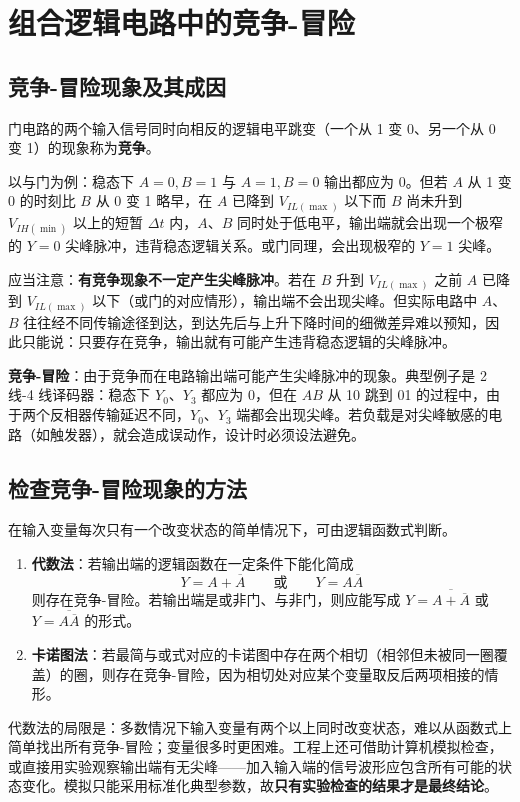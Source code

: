 \section{组合逻辑电路中的竞争-冒险}
\subsection{竞争-冒险现象及其成因}
门电路的两个输入信号同时向相反的逻辑电平跳变（一个从 1 变 0、另一个从 0 变 1）的现象称为\textbf{竞争}。

以与门为例：稳态下 \(A=0,B=1\) 与 \(A=1,B=0\) 输出都应为 0。但若 \(A\) 从 1 变 0 的时刻比 \(B\) 从 0 变 1 略早，在 \(A\) 已降到 \(V_{IL(\max)}\) 以下而 \(B\) 尚未升到 \(V_{IH(\min)}\) 以上的短暂 \(\Delta t\) 内，\(A\)、\(B\) 同时处于低电平，输出端就会出现一个极窄的 \(Y=0\) 尖峰脉冲，违背稳态逻辑关系。或门同理，会出现极窄的 \(Y=1\) 尖峰。

应当注意：\textbf{有竞争现象不一定产生尖峰脉冲}。若在 \(B\) 升到 \(V_{IL(\max)}\) 之前 \(A\) 已降到 \(V_{IL(\max)}\) 以下（或门的对应情形），输出端不会出现尖峰。但实际电路中 \(A\)、\(B\) 往往经不同传输途径到达，到达先后与上升下降时间的细微差异难以预知，因此只能说：只要存在竞争，输出就有可能产生违背稳态逻辑的尖峰脉冲。

\textbf{竞争-冒险}：由于竞争而在电路输出端可能产生尖峰脉冲的现象。典型例子是 2 线-4 线译码器：稳态下 \(Y_0\)、\(Y_3\) 都应为 0，但在 \(AB\) 从 10 跳到 01 的过程中，由于两个反相器传输延迟不同，\(Y_0\)、\(Y_3\) 端都会出现尖峰。若负载是对尖峰敏感的电路（如触发器），就会造成误动作，设计时必须设法避免。

\subsection{检查竞争-冒险现象的方法}
在输入变量每次只有一个改变状态的简单情况下，可由逻辑函数式判断。
\begin{enumerate}
    \item \textbf{代数法}：若输出端的逻辑函数在一定条件下能化简成
    \[
    Y=A+\overline{A}\qquad\text{或}\qquad Y=A\overline{A}
    \]
    则存在竞争-冒险。若输出端是或非门、与非门，则应能写成 \(Y=\overline{A+\overline{A}}\) 或 \(Y=\overline{A\overline{A}}\) 的形式。
    \item \textbf{卡诺图法}：若最简与或式对应的卡诺图中存在两个相切（相邻但未被同一圈覆盖）的圈，则存在竞争-冒险，因为相切处对应某个变量取反后两项相接的情形。
\end{enumerate}
代数法的局限是：多数情况下输入变量有两个以上同时改变状态，难以从函数式上简单找出所有竞争-冒险；变量很多时更困难。工程上还可借助计算机模拟检查，或直接用实验观察输出端有无尖峰——加入输入端的信号波形应包含所有可能的状态变化。模拟只能采用标准化典型参数，故\textbf{只有实验检查的结果才是最终结论}。

